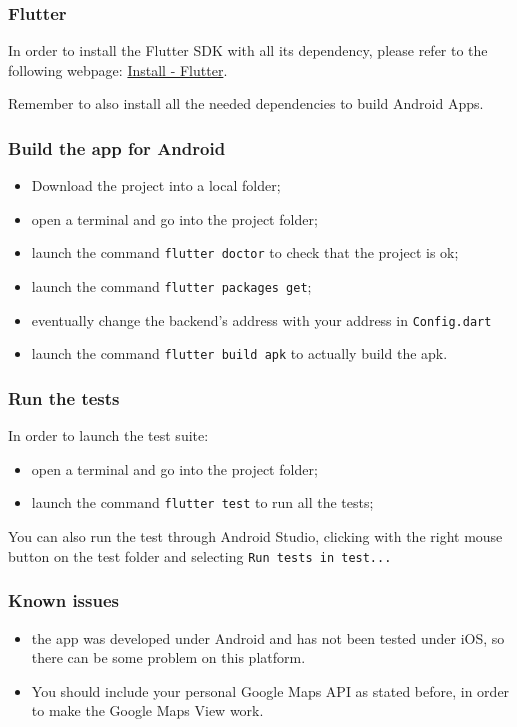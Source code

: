 \subsubsection{Flutter}
In order to install the Flutter SDK with all its dependency, please refer to the following webpage: \href{https://flutter.io/docs/get-started/install}{Install - Flutter}.

Remember to also install all the needed dependencies to build Android Apps.




\subsubsection{Build the app for Android}
\begin{itemize}
    \item Download the project into a local folder;
    \item open a terminal and go into the project folder;
    \item launch the command \texttt{flutter doctor} to check that the project is ok;
    \item launch the command \texttt{flutter packages get};
    \item eventually change the backend's address with your address in \texttt{Config.dart}
    \item launch the command \texttt{flutter build apk} to actually build the apk.
\end{itemize}

\subsubsection{Run the tests}
In order to launch the test suite:
\begin{itemize}
    \item open a terminal and go into the project folder;
    \item launch the command \texttt{flutter test} to run all the tests;
\end{itemize}

You can also run the test through Android Studio, clicking with the right mouse button on the test folder and selecting \texttt{Run tests in test...}

\subsubsection{Known issues}
\begin{itemize}
    \item the app was developed under Android and has not been tested under iOS, so there can be some problem on this platform.
    \item You should include your personal Google Maps API as stated before, in order to make the Google Maps View work.
\end{itemize}





